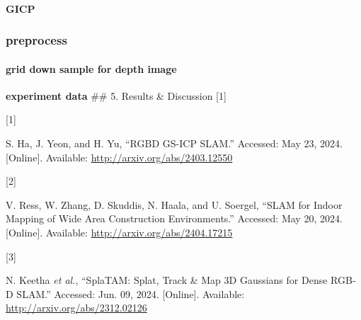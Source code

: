 \documentclass[
]{article}
\newlength{\cslhangindent}
\newlength{\csllabelwidth}
\newenvironment{CSLReferences}[2] %
 {\begin{list}{}{%
  \setlength{\itemindent}{0pt}
  \setlength{\leftmargin}{0pt}
  \setlength{\parsep}{0pt}
  \ifodd #1
   \setlength{\leftmargin}{\cslhangindent}
   \setlength{\itemindent}{-1\cslhangindent}
  \fi
  \setlength{\itemsep}{#2\baselineskip}}}
 {\end{list}}
\newcommand{\CSLLeftMargin}[1]{\parbox[t]{\csllabelwidth}{\strut#1\strut}}
\newcommand{\CSLRightInline}[1]{\parbox[t]{\linewidth - \csllabelwidth}{\strut#1\strut}}
\begin{document}
\paragraph{GICP}\label{gicp}

\subsubsection{preprocess}\label{preprocess}

\paragraph{grid down sample for depth
image}\label{grid-down-sample-for-depth-image}

\textbf{experiment data} \#\# 5. Results \& Discussion {[}1{]}

\label{refs}
\begin{CSLReferences}{0}{0}
\CSLLeftMargin{{[}1{]} }%
\CSLRightInline{S. Ha, J. Yeon, and H. Yu, {``{RGBD GS-ICP SLAM}.''}
Accessed: May 23, 2024. {[}Online{]}. Available:
\url{http://arxiv.org/abs/2403.12550}}

\CSLLeftMargin{{[}2{]} }%
\CSLRightInline{V. Ress, W. Zhang, D. Skuddis, N. Haala, and U. Soergel,
{``{SLAM} for {Indoor Mapping} of {Wide Area Construction
Environments}.''} Accessed: May 20, 2024. {[}Online{]}. Available:
\url{http://arxiv.org/abs/2404.17215}}

\CSLLeftMargin{{[}3{]} }%
\CSLRightInline{N. Keetha \emph{et al.}, {``{SplaTAM}: {Splat}, {Track}
\& {Map 3D Gaussians} for {Dense RGB-D SLAM}.''} Accessed: Jun. 09,
2024. {[}Online{]}. Available: \url{http://arxiv.org/abs/2312.02126}}

\end{CSLReferences}
\end{document}
